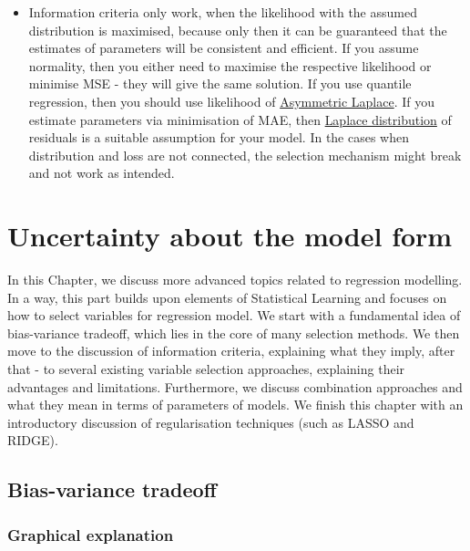 \documentclass[
]{book}
\providecommand{\tightlist}{%
  \setlength{\itemsep}{0pt}\setlength{\parskip}{0pt}}
\theoremstyle{definition}
\theoremstyle{definition}
\theoremstyle{definition}
\theoremstyle{definition}
\theoremstyle{remark}
\begin{document}
\begin{itemize}
\tightlist
\item
  Information criteria only work, when the likelihood with the assumed distribution is maximised, because only then it can be guaranteed that the estimates of parameters will be consistent and efficient. If you assume normality, then you either need to maximise the respective likelihood or minimise MSE - they will give the same solution. If you use quantile regression, then you should use likelihood of \protect\hyperlink{distributionsALaplace}{Asymmetric Laplace}. If you estimate parameters via minimisation of MAE, then \protect\hyperlink{distributionsLaplace}{Laplace distribution} of residuals is a suitable assumption for your model. In the cases when distribution and loss are not connected, the selection mechanism might break and not work as intended.
\end{itemize}

\hypertarget{uncertaintyModel}{%
\chapter{Uncertainty about the model form}\label{uncertaintyModel}}

In this Chapter, we discuss more advanced topics related to regression modelling. In a way, this part builds upon elements of Statistical Learning \citep[see, for example, the textbook of][]{Hastie2009} and focuses on how to select variables for regression model. We start with a fundamental idea of bias-variance tradeoff, which lies in the core of many selection methods. We then move to the discussion of information criteria, explaining what they imply, after that - to several existing variable selection approaches, explaining their advantages and limitations. Furthermore, we discuss combination approaches and what they mean in terms of parameters of models. We finish this chapter with an introductory discussion of regularisation techniques (such as LASSO and RIDGE).

\hypertarget{bias-variance-tradeoff}{%
\section{Bias-variance tradeoff}\label{bias-variance-tradeoff}}

\hypertarget{graphical-explanation}{%
\subsection{Graphical explanation}\label{graphical-explanation}}
\end{document}

